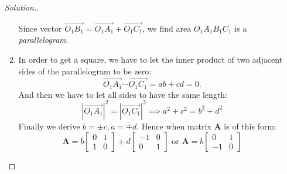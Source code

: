 \begin{enumerate}
\begin{proof}[Solution.]
\begin{enumerate}
\[\]
Since vector $\overrightarrow{O_1B_1}=\overrightarrow{O_1A_1}+\overrightarrow{O_1C_1}$, we find area $O_1A_1B_1C_1$ is a \emph{parallelogram}.
\item
In order to get a square, we have to let the inner product of two adjacent sides of the parallelogram to be zero:
\[
\overrightarrow{O_1A_1}\cdots\overrightarrow{O_1C_1}=ab+cd=0.
\]
And then we have to let all sides to have the same length:
\[
|\overrightarrow{O_1A_1}|^2=|\overrightarrow{O_1C_1}|^2\implies  a^2+c^2=b^2+d^2
\]
Finally we derive $b=\pm c, a=\mp d$. Hence when matrix $\bm A$ is of this form:
\[
\bm A=b\begin{bmatrix}
0&1\\1&0
\end{bmatrix}+d\begin{bmatrix}
-1&0\\0&1
\end{bmatrix}\text{ or }
\bm A=b\begin{bmatrix}
0&1\\-1&0


\end{bmatrix}\]
\end{enumerate}
\end{proof}
\end{enumerate}
